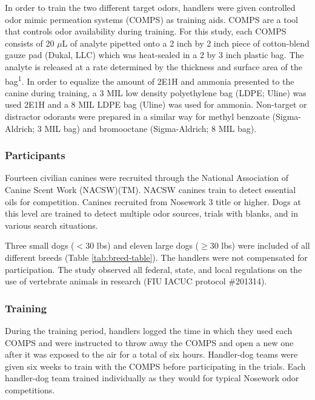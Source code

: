 \documentclass[
]{article}
\begin{document}
In order to train the two different target odors, handlers were given controlled odor mimic permeation systems (COMPS) as training aids. COMPS are a tool that controls odor availability during training. For this study, each COMPS consists of 20 \(\mu\)L of analyte pipetted onto a 2 inch by 2 inch piece of cotton-blend gauze pad (Dukal, LLC) which was heat-sealed in a 2 by 3 inch plastic bag. The analyte is released at a rate determined by the thickness and surface area of the bag\textsuperscript{1}. In order to equalize the amount of 2E1H and ammonia presented to the canine during training, a 3 MIL low density polyethylene bag (LDPE; Uline) was used 2E1H and a 8 MIL LDPE bag (Uline) was used for ammonia. Non-target or distractor odorants were prepared in a similar way for methyl benzoate (Sigma-Aldrich; 3 MIL bag) and bromooctane (Sigma-Aldrich; 8 MIL bag).

\hypertarget{participants}{%
\subsubsection{Participants}\label{participants}}

Fourteen civilian canines were recruited through the National Association of Canine Scent Work (NACSW)(TM). NACSW canines train to detect essential oils for competition. Canines recruited from Nosework 3 title or higher. Dogs at this level are trained to detect multiple odor sources, trials with blanks, and in various search situations.

Three small dogs (\(< 30\) lbs) and eleven large dogs (\(\geq 30\) lbs) were included of all different breeds (Table \ref{tab:breed-table}). The handlers were not compensated for participation. The study observed all federal, state, and local regulations on the use of vertebrate animals in research (FIU IACUC protocol \#201314).

\hypertarget{training}{%
\subsubsection{Training}\label{training}}

During the training period, handlers logged the time in which they used each COMPS and were instructed to throw away the COMPS and open a new one after it was exposed to the air for a total of six hours. Handler-dog teams were given six weeks to train with the COMPS before participating in the trials. Each handler-dog team trained individually as they would for typical Nosework odor competitions.
\end{document}
